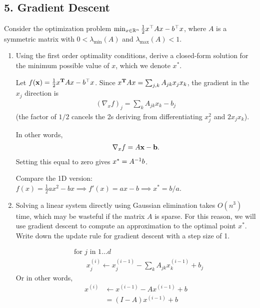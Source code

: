 \documentclass{article}
\begin{document}
\newpage
\subsection*{5. Gradient Descent}
Consider the optimization problem $\min_{x \in \mathbb{R}^n} \frac{1}{2} x^{\top} Ax - b^{\top}x$, where $A$ is a symmetric matrix with $0 < \lambda_{\min}(A)$ and $\lambda_{\max} (A) < 1$.
\begin{enumerate}[label=(\alph*)]
\item Using the first order optimality conditions, derive a closed-form
  solution for the minimum possible value of $x$, which we denote $x^*$.
  \begin{mdframed}
    Let $f(\mathbf x) = \frac{1}{2} x^{\mathbf{T}} Ax - b^{\top}x$. Since
    $x^{\mathbf{T}} Ax = \sum_{j,k}A_{jk}x_jx_k$, the gradient in the $x_j$ direction is
    \begin{align*}
      (\nabla_x f)_j = \sum_k A_{jk} x_k - b_j
    \end{align*}
    (the factor of $1/2$ cancels the 2s deriving from differentiating $x_j^2$
    and $2x_jx_k$).

    In other words,
    \begin{align*}
      \nabla_x f = A\mathbf x - \mathbf b.
    \end{align*}
    Setting this equal to zero gives $x^* = A^{-1}b$.


    Compare the 1D version:
    $f(x) = \frac{1}{2}ax^2 - bx \implies f'(x) = ax - b \implies x^* = b/a$.
  \end{mdframed}

  \item Solving a linear system directly using Gaussian elimination takes
    $O(n^3)$ time, which may be wasteful if the matrix $A$ is sparse. For this
    reason, we will use gradient descent to compute an approximation to the
    optimal point $x^*$. Write down the update rule for gradient descent with a
    step size of 1.
    \begin{mdframed}
      \begin{align*}
        &\text{for $j$ in $1 \ldots d$}\\
        &~~~~~~~~x^{(i)}_j \leftarrow x^{(i-1)}_j - \sum_k A_{jk} x^{(i-1)}_k + b_j
      \end{align*}
      Or in other words,
      \begin{align*}
        x^{(i)}
        &\leftarrow x^{(i-1)} - A x^{(i-1)} + b \\
        &= (I - A)x^{(i-1)} + b
      \end{align*}


\end{mdframed}
\end{enumerate}
\end{document}
